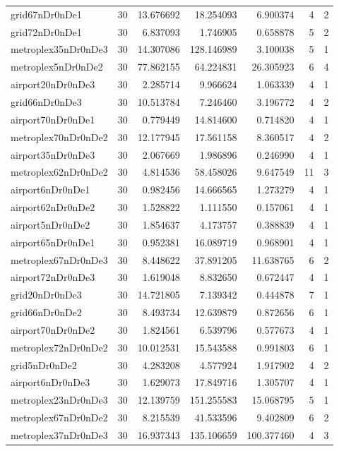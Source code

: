 \begin{longtable}{|l|r|r|r|r|r|r|}
grid67nDr0nDe1 & 30 & 13.676692 & 18.254093 & 6.900374 & 4 & 2 \\
grid72nDr0nDe1 & 30 & 6.837093 & 1.746905 & 0.658878 & 5 & 2 \\
metroplex35nDr0nDe3 & 30 & 14.307086 & 128.146989 & 3.100038 & 5 & 1 \\
metroplex5nDr0nDe2 & 30 & 77.862155 & 64.224831 & 26.305923 & 6 & 4 \\
airport20nDr0nDe3 & 30 & 2.285714 & 9.966624 & 1.063339 & 4 & 1 \\
grid66nDr0nDe3 & 30 & 10.513784 & 7.246460 & 3.196772 & 4 & 2 \\
airport70nDr0nDe1 & 30 & 0.779449 & 14.814600 & 0.714820 & 4 & 1 \\
metroplex70nDr0nDe2 & 30 & 12.177945 & 17.561158 & 8.360517 & 4 & 2 \\
airport35nDr0nDe3 & 30 & 2.067669 & 1.986896 & 0.246990 & 4 & 1 \\
metroplex62nDr0nDe2 & 30 & 4.814536 & 58.458026 & 9.647549 & 11 & 3 \\
airport6nDr0nDe1 & 30 & 0.982456 & 14.666565 & 1.273279 & 4 & 1 \\
airport62nDr0nDe2 & 30 & 1.528822 & 1.111550 & 0.157061 & 4 & 1 \\
airport5nDr0nDe2 & 30 & 1.854637 & 4.173757 & 0.388839 & 4 & 1 \\
airport65nDr0nDe1 & 30 & 0.952381 & 16.089719 & 0.968901 & 4 & 1 \\
metroplex67nDr0nDe3 & 30 & 8.448622 & 37.891205 & 11.638765 & 6 & 2 \\
airport72nDr0nDe3 & 30 & 1.619048 & 8.832650 & 0.672447 & 4 & 1 \\
grid20nDr0nDe3 & 30 & 14.721805 & 7.139342 & 0.444878 & 7 & 1 \\
grid66nDr0nDe2 & 30 & 8.493734 & 12.639879 & 0.872656 & 6 & 1 \\
airport70nDr0nDe2 & 30 & 1.824561 & 6.539796 & 0.577673 & 4 & 1 \\
metroplex72nDr0nDe2 & 30 & 10.012531 & 15.543588 & 0.991803 & 6 & 1 \\
grid5nDr0nDe2 & 30 & 4.283208 & 4.577924 & 1.917902 & 4 & 2 \\
airport6nDr0nDe3 & 30 & 1.629073 & 17.849716 & 1.305707 & 4 & 1 \\
metroplex23nDr0nDe3 & 30 & 12.139759 & 151.255583 & 15.068795 & 5 & 1 \\
metroplex67nDr0nDe2 & 30 & 8.215539 & 41.533596 & 9.402809 & 6 & 2 \\
metroplex37nDr0nDe3 & 30 & 16.937343 & 135.106659 & 100.377460 & 4 & 3 \\

\end{longtable}
